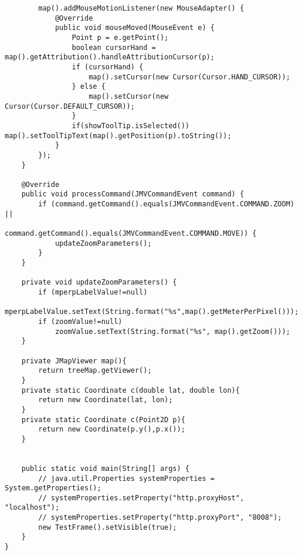 \begin{verbatim}
        map().addMouseMotionListener(new MouseAdapter() {
            @Override
            public void mouseMoved(MouseEvent e) {
                Point p = e.getPoint();
                boolean cursorHand = map().getAttribution().handleAttributionCursor(p);
                if (cursorHand) {
                    map().setCursor(new Cursor(Cursor.HAND_CURSOR));
                } else {
                    map().setCursor(new Cursor(Cursor.DEFAULT_CURSOR));
                }
                if(showToolTip.isSelected()) map().setToolTipText(map().getPosition(p).toString());
            }
        });
    }

    @Override
    public void processCommand(JMVCommandEvent command) {
        if (command.getCommand().equals(JMVCommandEvent.COMMAND.ZOOM) ||
                command.getCommand().equals(JMVCommandEvent.COMMAND.MOVE)) {
            updateZoomParameters();
        }
    }

    private void updateZoomParameters() {
        if (mperpLabelValue!=null)
            mperpLabelValue.setText(String.format("%s",map().getMeterPerPixel()));
        if (zoomValue!=null)
            zoomValue.setText(String.format("%s", map().getZoom()));
    }

    private JMapViewer map(){
        return treeMap.getViewer();
    }
    private static Coordinate c(double lat, double lon){
        return new Coordinate(lat, lon);
    }
    private static Coordinate c(Point2D p){
        return new Coordinate(p.y(),p.x());
    }


    public static void main(String[] args) {
        // java.util.Properties systemProperties = System.getProperties();
        // systemProperties.setProperty("http.proxyHost", "localhost");
        // systemProperties.setProperty("http.proxyPort", "8008");
        new TestFrame().setVisible(true);
    }
}
\end{verbatim}


